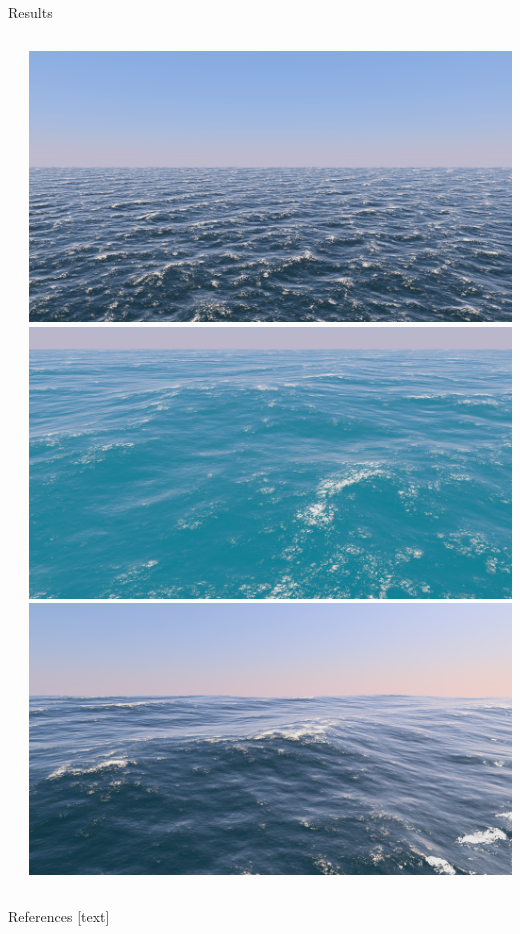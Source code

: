 \documentclass[final,hyperref={pdfpagelabels=true}]{beamer}
\begin{document}
\begin{frame}[fragile]
\begin{center}
\begin{minipage}{\textwidth}
\begin{block}{Results}
\begin{columns}[t]
\begin{column}{0.4\linewidth}
				\end{column}
				\begin{column}{0.5\linewidth}
				\begin{center}
				\noindent
				\includegraphics[width=0.3135\columnwidth]{figures/21-06-2018_10-44-51_complete}
				\includegraphics[width=0.3135\columnwidth]{figures/21-06-2018_13-45-06_complete}
				\includegraphics[width=0.3135\columnwidth]{figures/21-06-2018_12-48-51_complete}	
				\end{center}
				\end{column}
			\end{columns}
		\end{block}
	\end{minipage}
	\begin{minipage}{\textwidth}
		\begin{block}{References}
%			
%       		
			\tiny
			[text]
			\begin{multicols}{2}
			\centering
			
			
			\end{multicols}
		\end{block}
	\end{minipage}
	\end{center}
    

\end{frame}
\end{document}
